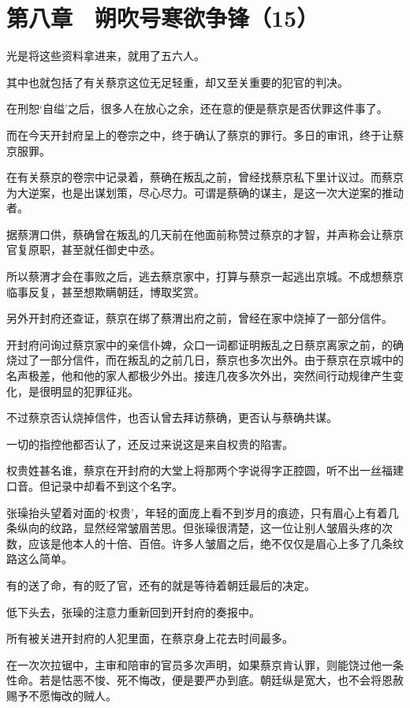 \section{第八章　朔吹号寒欲争锋（15）}

光是将这些资料拿进来，就用了五六人。

其中也就包括了有关蔡京这位无足轻重，却又至关重要的犯官的判决。

在刑恕‘自缢’之后，很多人在放心之余，还在意的便是蔡京是否伏罪这件事了。

而在今天开封府呈上的卷宗之中，终于确认了蔡京的罪行。多日的审讯，终于让蔡京服罪。

在有关蔡京的卷宗中记录着，蔡确在叛乱之前，曾经找蔡京私下里计议过。而蔡京为大逆案，也是出谋划策，尽心尽力。可谓是蔡确的谋主，是这一次大逆案的推动者。

据蔡渭口供，蔡确曾在叛乱的几天前在他面前称赞过蔡京的才智，并声称会让蔡京官复原职，甚至就任御史中丞。

所以蔡渭才会在事败之后，逃去蔡京家中，打算与蔡京一起逃出京城。不成想蔡京临事反复，甚至想欺瞒朝廷，博取奖赏。

另外开封府还查证，蔡京在绑了蔡渭出府之前，曾经在家中烧掉了一部分信件。

开封府问询过蔡京家中的亲信仆婢，众口一词都证明叛乱之日蔡京离家之前，的确烧过了一部分信件，而在叛乱的之前几日，蔡京也多次出外。由于蔡京在京城中的名声极差，他和他的家人都极少外出。接连几夜多次外出，突然间行动规律产生变化，是很明显的犯罪征兆。

不过蔡京否认烧掉信件，也否认曾去拜访蔡确，更否认与蔡确共谋。

一切的指控他都否认了，还反过来说这是来自权贵的陷害。

权贵姓甚名谁，蔡京在开封府的大堂上将那两个字说得字正腔圆，听不出一丝福建口音。但记录中却看不到这个名字。

张璪抬头望着对面的‘权贵’，年轻的面庞上看不到岁月的痕迹，只有眉心上有着几条纵向的纹路，显然经常皱眉苦思。但张璪很清楚，这一位让别人皱眉头疼的次数，应该是他本人的十倍、百倍。许多人皱眉之后，绝不仅仅是眉心上多了几条纹路这么简单。

有的送了命，有的贬了官，还有的就是等待着朝廷最后的决定。

低下头去，张璪的注意力重新回到开封府的奏报中。

所有被关进开封府的人犯里面，在蔡京身上花去时间最多。

在一次次拉锯中，主审和陪审的官员多次声明，如果蔡京肯认罪，则能饶过他一条性命。若是怙恶不悛、死不悔改，便是要严办到底。朝廷纵是宽大，也不会将恩赦赐予不愿悔改的贼人。

